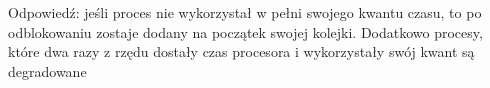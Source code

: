 Odpowiedź: jeśli proces nie wykorzystał w pełni swojego kwantu czasu, to po odblokowaniu zostaje dodany na początek swojej kolejki. Dodatkowo procesy, które dwa razy z rzędu dostały czas procesora i wykorzystały swój kwant są degradowane
